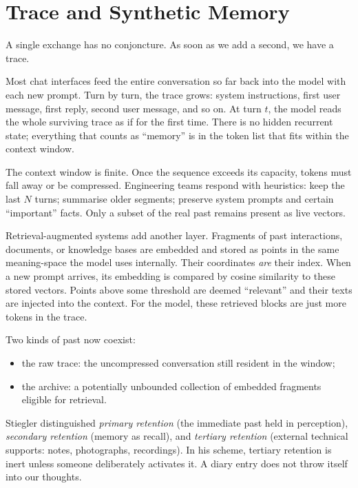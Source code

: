 \documentclass[12pt,a4paper]{article}
\begin{document}
\section{Trace and Synthetic Memory}

A single exchange has no conjoncture. As soon as we add a second, we have a trace.

Most chat interfaces feed the entire conversation so far back into the model with each new prompt. Turn by turn, the trace grows: system instructions, first user message, first reply, second user message, and so on. At turn $t$, the model reads the whole surviving trace as if for the first time. There is no hidden recurrent state; everything that counts as ``memory'' is in the token list that fits within the context window.

The context window is finite. Once the sequence exceeds its capacity, tokens must fall away or be compressed. Engineering teams respond with heuristics: keep the last $N$ turns; summarise older segments; preserve system prompts and certain ``important'' facts. Only a subset of the real past remains present as live vectors.

Retrieval-augmented systems add another layer. Fragments of past interactions, documents, or knowledge bases are embedded and stored as points in the same meaning-space the model uses internally. Their coordinates \emph{are} their index. When a new prompt arrives, its embedding is compared by cosine similarity to these stored vectors. Points above some threshold are deemed ``relevant'' and their texts are injected into the context. For the model, these retrieved blocks are just more tokens in the trace.

Two kinds of past now coexist:

\begin{itemize}
  \item the raw trace: the uncompressed conversation still resident in the window;
  \item the archive: a potentially unbounded collection of embedded fragments eligible for retrieval.
\end{itemize}

Stiegler distinguished \emph{primary retention} (the immediate past held in perception), \emph{secondary retention} (memory as recall), and \emph{tertiary retention} (external technical supports: notes, photographs, recordings).\cite{stiegler1998technics} In his scheme, tertiary retention is inert unless someone deliberately activates it. A diary entry does not throw itself into our thoughts.
\end{document}
